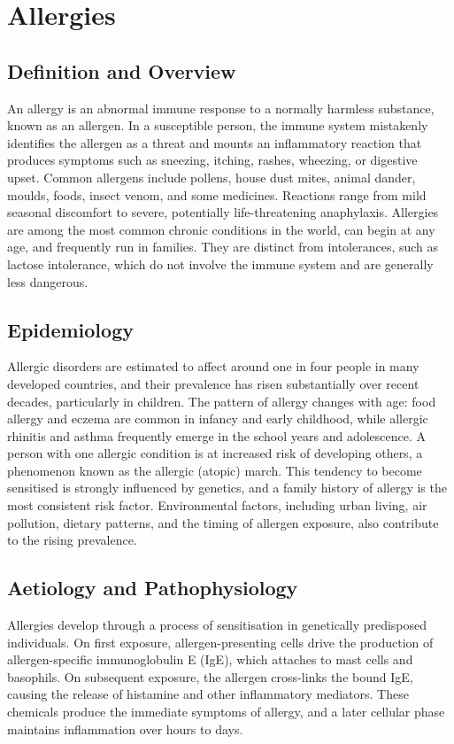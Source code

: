 \chapter{Allergies}

\section*{Definition and Overview}
An allergy is an abnormal immune response to a normally harmless substance, known as an allergen. In a susceptible person, the immune system mistakenly identifies the allergen as a threat and mounts an inflammatory reaction that produces symptoms such as sneezing, itching, rashes, wheezing, or digestive upset. Common allergens include pollens, house dust mites, animal dander, moulds, foods, insect venom, and some medicines. Reactions range from mild seasonal discomfort to severe, potentially life-threatening anaphylaxis. Allergies are among the most common chronic conditions in the world, can begin at any age, and frequently run in families. They are distinct from intolerances, such as lactose intolerance, which do not involve the immune system and are generally less dangerous.

\section*{Epidemiology}
Allergic disorders are estimated to affect around one in four people in many developed countries, and their prevalence has risen substantially over recent decades, particularly in children. The pattern of allergy changes with age: food allergy and eczema are common in infancy and early childhood, while allergic rhinitis and asthma frequently emerge in the school years and adolescence. A person with one allergic condition is at increased risk of developing others, a phenomenon known as the allergic (atopic) march. This tendency to become sensitised is strongly influenced by genetics, and a family history of allergy is the most consistent risk factor. Environmental factors, including urban living, air pollution, dietary patterns, and the timing of allergen exposure, also contribute to the rising prevalence.

\section*{Aetiology and Pathophysiology}
Allergies develop through a process of sensitisation in genetically predisposed individuals. On first exposure, allergen-presenting cells drive the production of allergen-specific immunoglobulin E (IgE), which attaches to mast cells and basophils. On subsequent exposure, the allergen cross-links the bound IgE, causing the release of histamine and other inflammatory mediators. These chemicals produce the immediate symptoms of allergy, and a later cellular phase maintains inflammation over hours to days.

